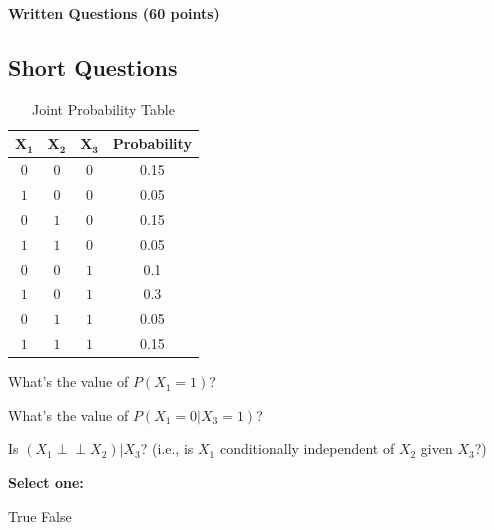 \documentclass[11pt,addpoints,answers]{exam}
\newcommand{\independent}{\perp\!\!\!\perp  }
\begin{document}
{\LARGE \bf Written Questions (60 points)}
\begin{questions}

\section{Short Questions}

\begin{table}[H] %
    \centering
    \begin{tabular}{|c|c|c|c|}
    \hline
        $\mathbf{X_1}$ & $\mathbf{X_2}$ & $\mathbf{X_3}$ & Probability  \\  \hline
        $0$ & $0$ & $0$ & 0.15 \\  \hline
        $1$ & $0$  & $0$ & 0.05   \\  \hline
        $0$ & $1$  & $0$ & 0.15   \\  \hline
        $1$ & $1$  & $0$ & 0.05   \\  \hline
        $0$ & $0$  & $1$ & 0.1   \\  \hline
        $1$ & $0$  & $1$ & 0.3   \\  \hline
        $0$ & $1$  & $1$ & 0.05   \\  \hline
        $1$ & $1$  & $1$ & 0.15   \\  \hline
    \end{tabular}
    \caption{Joint Probability Table}
\end{table}

\begin{questions}

\question[2] What's the value of $P(X_1=1)$?

\begin{your_solution}[title=Your answer:,height=2cm,width=5cm]
\end{your_solution}

\question[2] What's the value of $P(X_1=0 | X_3=1)$?

\begin{your_solution}[title=Your answer:,height=2cm,width=5cm]
\end{your_solution}


\question[3] Is $(X_1 \independent X_2) | X_3$?  (i.e., is $X_1$ conditionally independent of $X_2$ given $X_3$?)

\textbf{Select one:}
    \begin{checkboxes}
        \choice True
        \choice False
\end{checkboxes}



\end{questions}
\end{questions}
\end{document}
